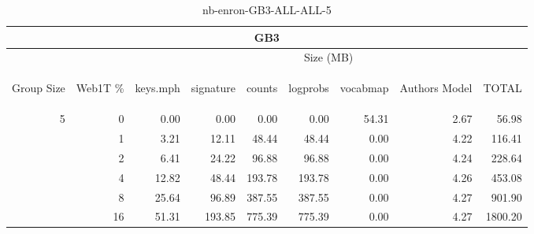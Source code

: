 \begin{center}
\begin{table}[htbp] 
 \begin{center}
\begin{tabular}{ | r | r | r | r | r | r | r | r | r |}
\hline
\multicolumn{9}{|c|}{GB3}\\
\hline
 & & \multicolumn{7}{|c|}{Size (MB)}\\ \cline{3-9}
\begin{sideways}Group Size\end{sideways} & \begin{sideways}Web1T \% \end{sideways} & \begin{sideways}keys.mph\end{sideways} & \begin{sideways}signature\end{sideways} & \begin{sideways}counts\end{sideways} & \begin{sideways}logprobs\end{sideways} & \begin{sideways}vocabmap\end{sideways} & \begin{sideways}Authors Model \end{sideways} & \begin{sideways}TOTAL\end{sideways}\\
\hline
\multirow{5}{*}{5}
 & 0 & 0.00 & 0.00 & 0.00 & 0.00 & 54.31 & 2.67 & 56.98\\ \cline{2-9}
 & 1 & 3.21 & 12.11 & 48.44 & 48.44 & 0.00 & 4.22 & 116.41\\ \cline{2-9}
 & 2 & 6.41 & 24.22 & 96.88 & 96.88 & 0.00 & 4.24 & 228.64\\ \cline{2-9}
 & 4 & 12.82 & 48.44 & 193.78 & 193.78 & 0.00 & 4.26 & 453.08\\ \cline{2-9}
 & 8 & 25.64 & 96.89 & 387.55 & 387.55 & 0.00 & 4.27 & 901.90\\ \cline{2-9}
 & 16 & 51.31 & 193.85 & 775.39 & 775.39 & 0.00 & 4.27 & 1800.20\\ \cline{2-9}
\hline
\end{tabular}
\caption{nb-enron-GB3-ALL-ALL-5}
\label{table:nb-enron-GB3-ALL-ALL-5}
\end{center}
 \end{table}
\end{center}

